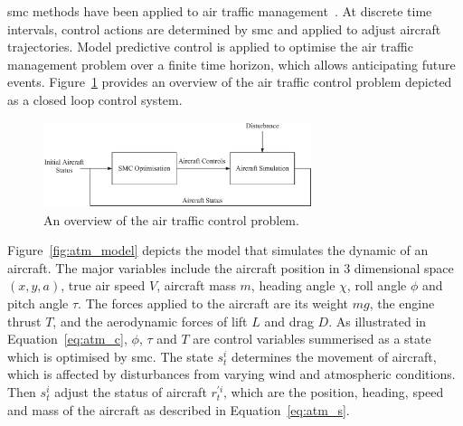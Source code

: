 \gls{smc} methods have been applied to air traffic management~\cite{kantas09,chau13acm,eele13cdc,eele13gnc,lymperopoulos10,lymperopoulos10thesis}.
At discrete time intervals, control actions are determined by \gls{smc} and applied to adjust aircraft trajectories.
Model predictive control is applied to optimise the air traffic management problem over a finite time horizon, which allows anticipating future events.
Figure~\ref{fig:smc_mpc} provides an overview of the air traffic control problem depicted as a closed loop control system.

\begin{figure}[ht]
\begin{center}
\includegraphics[width=0.7\textwidth]{2_background/figures/smc_mpc}
\end{center}
\caption{An overview of the air traffic control problem.}
\label{fig:smc_mpc}
\end{figure}

Figure~\ref{fig:atm_model} depicts the model that simulates the dynamic of an aircraft.
The major variables include the aircraft position in 3 dimensional space $(x,y,a)$, true air speed $V$, aircraft mass $m$, heading angle $\chi$, roll angle $\phi$ and pitch angle $\tau$.
The forces applied to the aircraft are its weight $mg$, the engine thrust $T$, and the aerodynamic forces of lift $L$ and drag $D$.
As illustrated in Equation~\ref{eq:atm_c}, $\phi$, $\tau$ and $T$ are control variables summerised as a state which is optimised by \gls{smc}.
The state $s^i_{t}$ determines the movement of aircraft, which is affected by disturbances from varying wind and atmospheric conditions.
Then $s^i_{t}$ adjust the status of aircraft $r^{'i}_{t}$, which are the position, heading, speed and mass of the aircraft as described in Equation~\ref{eq:atm_s}.

